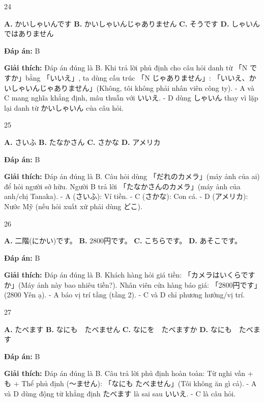 \documentclass[12pt,a4paper]{report}
\newcommand{\source}[1]{}
\newcommand{\choice}[2]{\textbf{#1.} #2 \quad}
\newcommand{\answer}[1]{\par\textbf{Đáp án:} #1}
\newcommand{\confidence}[1]{}
\newcommand{\explain}[1]{\par\textbf{Giải thích:} #1\vspace{0.5cm}}
\begin{document}
\begin{question}{24}
\source{Q13.jpg}
\choice{A}{かいしゃいんです}
\choice{B}{かいしゃいんじゃありません}
\choice{C}{そうです}
\choice{D}{しゃいんではありません}
\answer{B}
\confidence{high}
\explain{Đáp án đúng là B. Khi trả lời phủ định cho câu hỏi danh từ 「N ですか」bằng 「いいえ」, ta dùng cấu trúc 「N じゃありません」: 「いいえ、かいしゃいんじゃありません」(Không, tôi không phải nhân viên công ty).
- A và C mang nghĩa khẳng định, mâu thuẫn với いいえ.
- D dùng しゃいん thay vì lặp lại danh từ かいしゃいん của câu hỏi.}
\end{question}

\begin{question}{25}
\source{Q15.jpg}
\choice{A}{さいふ}
\choice{B}{たなかさん}
\choice{C}{さかな}
\choice{D}{アメリカ}
\answer{B}
\confidence{high}
\explain{Đáp án đúng là B. Câu hỏi dùng 「だれのカメラ」(máy ảnh của ai) để hỏi người sở hữu. Người B trả lời 「たなかさんのカメラ」(máy ảnh của anh/chị Tanaka).
- A (さいふ): Ví tiền.
- C (さかな): Con cá.
- D (アメリカ): Nước Mỹ (nếu hỏi xuất xứ phải dùng どこ).}
\end{question}

\begin{question}{26}
\source{Q16.jpg}
\choice{A}{二階(にかい)です。}
\choice{B}{2800円です。}
\choice{C}{こちらです。}
\choice{D}{あそこです。}
\answer{B}
\confidence{high}
\explain{Đáp án đúng là B. Khách hàng hỏi giá tiền: 「カメラはいくらですか」(Máy ảnh này bao nhiêu tiền?). Nhân viên cửa hàng báo giá: 「2800円です」(2800 Yên ạ).
- A báo vị trí tầng (tầng 2).
- C và D chỉ phương hướng/vị trí.}
\end{question}

\begin{question}{27}
\source{Q19.jpg}
\choice{A}{たべます}
\choice{B}{なにも　たべません}
\choice{C}{なにを　たべますか}
\choice{D}{なにも　たべます}
\answer{B}
\confidence{high}
\explain{Đáp án đúng là B. Câu trả lời phủ định hoàn toàn: Từ nghi vấn + も + Thể phủ định (〜ません): 「なにも たべません」(Tôi không ăn gì cả).
- A và D dùng động từ khẳng định たべます là sai sau いいえ.
- C là câu hỏi.}
\end{question}
\end{document}
